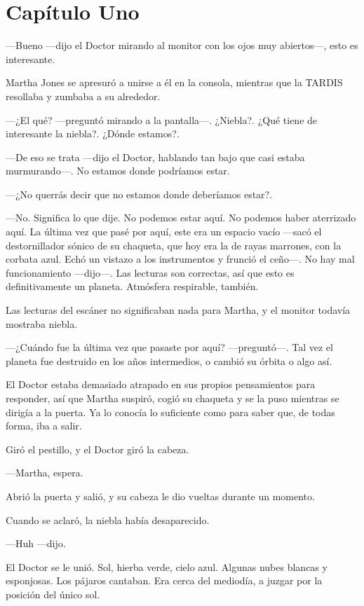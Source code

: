 \chapter*{Capítulo Uno}

---Bueno ---dijo el Doctor mirando al monitor con los ojos muy abiertos---, esto es interesante.

Martha Jones se apresuró a unirse a él en la consola, mientras que la TARDIS resollaba y zumbaba a su alrededor.

---¿El qué? ---preguntó mirando a la pantalla---. ¿Niebla?. ¿Qué tiene de interesante la niebla?. ¿Dónde estamos?.

---De eso se trata ---dijo el Doctor, hablando tan bajo que casi estaba murmurando---. No estamos donde podríamos estar.

---¿No querrás decir que no estamos donde deberíamos estar?.

---No. Significa lo que dije. No podemos estar aquí. No podemos haber aterrizado aquí. La última vez que pasé por aquí, este era un espacio vacío ---sacó el destornillador sónico de su chaqueta, que hoy era la de rayas marrones, con la corbata azul. Echó un vistazo a los instrumentos y frunció el ceño---. No hay mal funcionamiento ---dijo---. Las lecturas son correctas, así que esto es definitivamente un planeta. Atmósfera respirable, también.

Las lecturas del escáner no significaban nada para Martha, y el monitor todavía mostraba niebla.

---¿Cuándo fue la última vez que pasaste por aquí? ---preguntó---. Tal vez el planeta fue destruido en los años intermedios, o cambió su órbita o algo así.

El Doctor estaba demasiado atrapado en sus propios pensamientos para responder, así que Martha suspiró, cogió su chaqueta y se la puso mientras se dirigía a la puerta. Ya lo conocía lo suficiente como para saber que, de todas forma, iba a salir.

Giró el pestillo, y el Doctor giró la cabeza.

---Martha, espera.

Abrió la puerta y salió, y su cabeza le dio vueltas durante un momento.

Cuando se aclaró, la niebla había desaparecido.

---Huh ---dijo.

El Doctor se le unió. Sol, hierba verde, cielo azul. Algunas nubes blancas y esponjosas. Los pájaros cantaban. Era cerca del mediodía, a juzgar por la posición del único sol.

